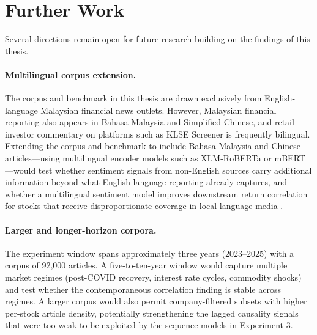 \documentclass[12pt]{ucetd}
\begin{document}
\section{Further Work}

Several directions remain open for future research building on the findings of this thesis.

\paragraph{Multilingual corpus extension.}
The corpus and benchmark in this thesis are drawn exclusively from English-language Malaysian financial news outlets. However, Malaysian financial reporting also appears in Bahasa Malaysia and Simplified Chinese, and retail investor commentary on platforms such as KLSE Screener is frequently bilingual. Extending the corpus and benchmark to include Bahasa Malaysia and Chinese articles---using multilingual encoder models such as XLM-RoBERTa or mBERT---would test whether sentiment signals from non-English sources carry additional information beyond what English-language reporting already captures, and whether a multilingual sentiment model improves downstream return correlation for stocks that receive disproportionate coverage in local-language media \cite{hedderich2021survey}.

\paragraph{Larger and longer-horizon corpora.}
The experiment window spans approximately three years (2023--2025) with a corpus of 92,000 articles. A five-to-ten-year window would capture multiple market regimes (post-COVID recovery, interest rate cycles, commodity shocks) and test whether the contemporaneous correlation finding is stable across regimes. A larger corpus would also permit company-filtered subsets with higher per-stock article density, potentially strengthening the lagged causality signals that were too weak to be exploited by the sequence models in Experiment 3.
\end{document}
